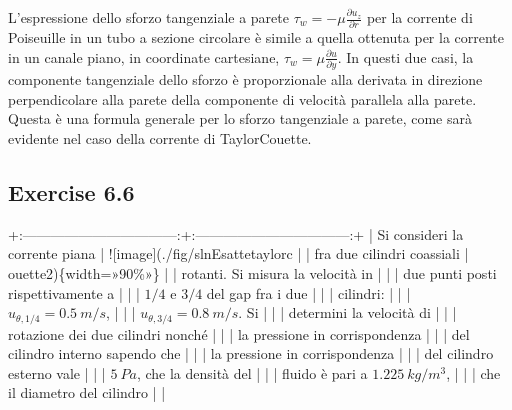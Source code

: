 \documentclass[letterpaper,10pt,italian]{jupyterBook}
\begin{document}
\sphinxAtStartPar
L’espressione dello sforzo tangenziale a parete
\(\tau_w = - \mu \frac{\partial u_z}{\partial r}\) per la corrente di
Poiseuille in un tubo a sezione circolare è simile a quella ottenuta per
la corrente in un canale piano, in coordinate cartesiane,
\(\tau_w = \mu \frac{\partial u}{\partial y}\). In questi due casi, la
componente tangenziale dello sforzo è proporzionale alla derivata in
direzione perpendicolare alla parete della componente di velocità
parallela alla parete. Questa  è una formula generale per lo
sforzo tangenziale a parete, come sarà evidente nel caso della corrente
di Taylor\sphinxhyphen{}Couette.

\sphinxstepscope


\subsection{Exercise 6.6}
\label{\detokenize{polimi/fluidmechanics-ita/template/capitoli/06_slnEsatte/0601in:exercise-6-6}}\label{\detokenize{polimi/fluidmechanics-ita/template/capitoli/06_slnEsatte/0601in:fluid-mechanics-exact-solutions-ex06}}\label{\detokenize{polimi/fluidmechanics-ita/template/capitoli/06_slnEsatte/0601in::doc}}
\sphinxAtStartPar
+:———————————:+:———————————:+
| Si consideri la corrente piana    | !{[}image{]}(./fig/slnEsatte\sphinxhyphen{}taylor\sphinxhyphen{}c |
| fra due cilindri coassiali        | ouette\sphinxhyphen{}2)\{width=»90\%»\}            |
| rotanti. Si misura la velocità in |                                   |
| due punti posti rispettivamente a |                                   |
| \(1/4\) e \(3/4\) del gap fra i due   |                                   |
| cilindri:                         |                                   |
| \(u_{\theta,1/4} = 0.5\ m/s\),      |                                   |
| \(u_{\theta,3/4} = 0.8\ m/s\). Si   |                                   |
| determini la velocità di          |                                   |
| rotazione dei due cilindri nonché |                                   |
| la pressione in corrispondenza    |                                   |
| del cilindro interno sapendo che  |                                   |
| la pressione in corrispondenza    |                                   |
| del cilindro esterno vale         |                                   |
| \(5\ Pa\), che la densità del       |                                   |
| fluido è pari a \(1.225\ kg/m^3\),  |                                   |
| che il diametro del cilindro      |                                   |
\end{document}
